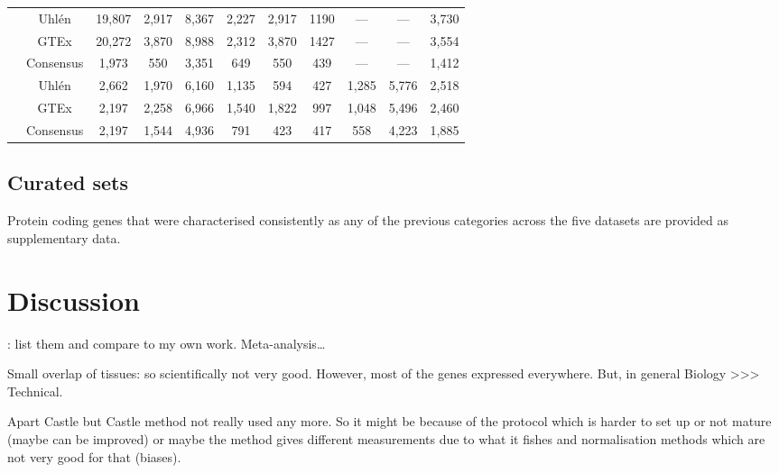 \begin{landscape}
\begin{table}[]
\begin{tabular}{@{}ccccccccccc@{}}
& Uhlén & 19,807 & 2,917 & 8,367 & 2,227 &
2,917  & 1190  & --- & --- & 3,730  \\
& GTEx & 20,272 & 3,870 & 8,988  & 2,312 &
3,870  & 1427  & --- & --- & 3,554  \\
\cmidrule(l){2-11}
& Consensus & 1,973 & 550 & 3,351 & 649 &
550  & 439 & --- & --- & 1,412  \\
\midrule
\multirow{3}{*}{\rotatebox[origin=c]{90}{\parbox[c]{1.7cm}{\centering Common\\ 23
tissues\\ Working datasets}}} & Uhlén & 2,662  & 1,970  &
6,160 & 1,135 & 594  & 427 & 1,285 &
5,776 & 2,518 \\
& GTEx & 2,197 & 2,258 & 6,966  & 1,540 &
1,822  & 997 & 1,048 & 5,496  & 2,460 \\
\cmidrule(l){2-11}
& Consensus & 2,197 & 1,544 & 4,936 & 791 &
423 & 417 & 558 & 4,223 & 1,885 \\
\bottomrule
\end{tabular}
\end{table}
\end{landscape}
\pagestyle{scrheadings}


\subsection{Curated sets}\label{subsec:Trans_curatedSets}
Protein coding genes that were characterised consistently
as any of the previous categories across the five datasets
are provided as supplementary data.


\section{Discussion}\label{sec:Trans_discussion}
: list them and compare to my own
work. Meta-analysis\ldots

Small overlap of tissues: so scientifically not very good.
However, most of the genes expressed everywhere.
But, in general Biology >>> Technical.

Apart Castle but Castle method not really used any more. So it might be because of
the protocol which is harder to set up or not mature (maybe can be improved) or
maybe the method gives different measurements due to what it fishes and
normalisation methods which are not very good for that (biases).


